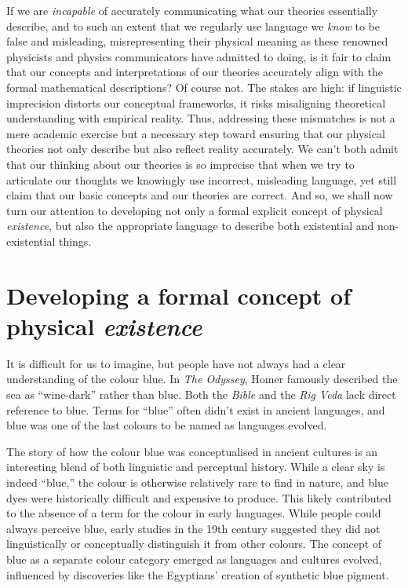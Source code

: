 \documentclass[aps,rmp,groupedaddress,twocolumn,10pt]{revtex4-2}
\begin{document}
If we are \textit{incapable} of accurately communicating what our theories essentially describe, and to such an extent that we regularly use language we \textit{know} to be false and misleading, misrepresenting their physical meaning as these renowned physicists and physics communicators have admitted to doing, is it fair to claim that our concepts and interpretations of our theories accurately align with the formal mathematical descriptions? Of course not. The stakes are high: if linguistic imprecision distorts our conceptual frameworks, it risks misaligning theoretical understanding with empirical reality. Thus, addressing these mismatches is not a mere academic exercise but a necessary step toward ensuring that our physical theories not only describe but also reflect reality accurately. We can't both admit that our thinking about our theories is so imprecise that when we try to articulate our thoughts we knowingly use incorrect, misleading language, yet still claim that our basic concepts and our theories are correct. And so, we shall now turn our attention to developing not only a formal explicit concept of physical \textit{existence}, but also the appropriate language to describe both existential and non-existential things.

\section{Developing a formal concept of physical \textit{existence}}\label{sec:existence}

It is difficult for us to imagine, but people have not always had a clear understanding of the colour blue. In \textit{The Odyssey}, Homer famously described the sea as ``wine-dark'' rather than blue. Both the \textit{Bible} and the \textit{Rig Veda} lack direct reference to blue. Terms for ``blue'' often didn't exist in ancient languages, and blue was one of the last colours to be named as languages evolved.

The story of how the colour blue was conceptualised in ancient cultures is an interesting blend of both linguistic and perceptual history. While a clear sky is indeed ``blue,'' the colour is otherwise relatively rare to find in nature, and blue dyes were historically difficult and expensive to produce. This likely contributed to the absence of a term for the colour in early languages. While people could always perceive blue, early studies in the 19th century suggested they did not linguistically or conceptually distinguish it from other colours. The concept of blue as a separate colour category emerged as languages and cultures evolved, influenced by discoveries like the Egyptians' creation of synthetic blue pigment.
\end{document}
